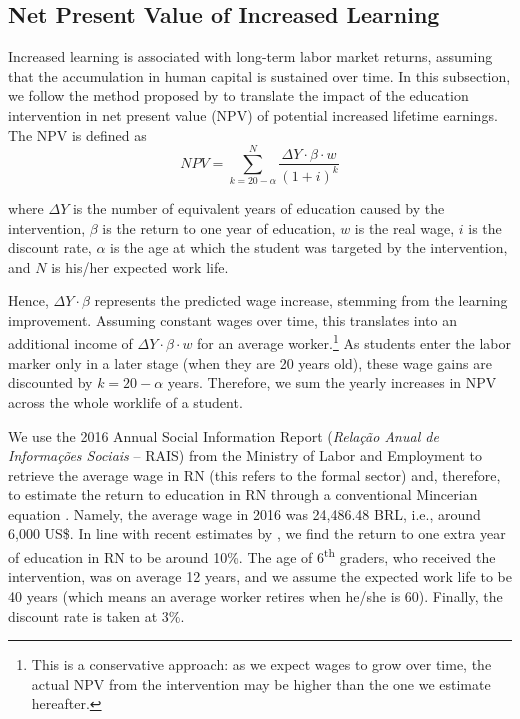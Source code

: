 \documentclass[11pt,a4paper]{article}
\begin{document}
\clearpage

\subsection{Net Present Value of Increased Learning} \label{sec:NPV}

Increased learning is associated with long-term labor market returns, assuming that the accumulation in human capital is sustained over time. In this subsection, we follow the method proposed by \citet{evans2019equivalent} to translate the impact of the education intervention in net present value (NPV) of potential increased lifetime earnings. The NPV is defined as
\begin{equation}
    NPV = \sum_{k=20-\alpha}^{N} \frac{\Delta Y \cdot \beta \cdot w}{(1+i)^k}
\end{equation}

where $\Delta Y$ is the number of equivalent years of education caused by the intervention, $\beta$ is the return to one year of education, $w$ is the real wage, $i$ is the discount rate, $\alpha$ is the age at which the student was targeted by the intervention, and $N$ is his/her expected work life.

Hence, $\Delta Y \cdot \beta$ represents the predicted wage increase, stemming from the learning improvement. Assuming constant wages over time, this translates into an additional income of $\Delta Y \cdot \beta \cdot w$ for an average worker.\footnote{This is a conservative approach: as we expect wages to grow over time, the actual NPV from the intervention may be higher than the one we estimate hereafter.} As students enter the labor marker only in a later stage (when they are 20 years old), these wage gains are discounted by $k=20-\alpha$ years. Therefore, we sum the yearly increases in NPV across the whole worklife of a student.

We use the 2016 Annual Social Information Report (\textit{Relação Anual de Informações Sociais} -- RAIS) from the Ministry of Labor and Employment to retrieve the average wage in RN (this refers to the formal sector) and, therefore, to estimate the return to education in RN through a conventional Mincerian equation \citep{mincer1974schooling}. Namely, the average wage in 2016 was 24,486.48 BRL, i.e., around 6,000 US\$. In line with recent estimates by \citet{psacharopoulos2018returns}, we find the return to one extra year of education in RN to be around 10\%. The age of 6\textsuperscript{th} graders, who received the intervention, was on average 12 years, and we assume the expected work life to be 40 years (which means an average worker retires when he/she is 60). Finally, the discount rate is taken at 3\%.
\end{document}
